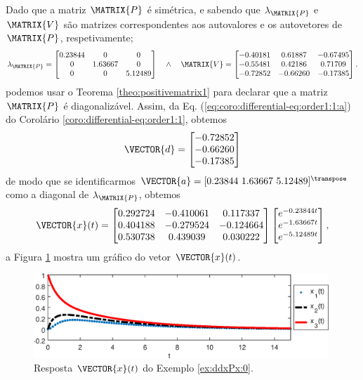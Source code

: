 \begin{SolutionT}
\label{ex:dxPx:0:sol1}
Dado que a matriz $\MATRIX{P}$ é simétrica, e
sabendo que $\lambda_{\MATRIX{P}}$ e $\MATRIX{V}$ são matrizes correspondentes aos autovalores e os autovetores de $\MATRIX{P}$,
respetivamente; 
\begin{equation}
\lambda_{\MATRIX{P}}=
\begin{bmatrix}
   0.23844 &       0 &       0\\
         0 & 1.63667 &       0\\
         0 &       0 & 5.12489
\end{bmatrix}
\quad \wedge \quad
\MATRIX{V}=
\begin{bmatrix}
  -0.40181 & 0.61887 &-0.67495\\
  -0.55481 & 0.42186 & 0.71709\\
  -0.72852 &-0.66260 &-0.17385
\end{bmatrix}.
\end{equation}
podemos usar o Teorema \ref{theo:positivematrix1} para declarar que a matriz $\MATRIX{P}$ é diagonalizável. 
Assim, da Eq. (\ref{eq:coro:differential-eq:order1:1:a}) do Corolário \ref{coro:differential-eq:order1:1},
obtemos
\begin{equation}
\VECTOR{d}=
\begin{bmatrix}
  -0.72852\\
  -0.66260\\
  -0.17385
\end{bmatrix}
\end{equation}
de modo que se identificarmos $\VECTOR{a}=[0.23844~ 1.63667~ 5.12489]^{\transpose}$ 
como a diagonal de $\lambda_{\MATRIX{P}}$,
obtemos
\begin{equation}
 \VECTOR{x}(t)= 
\begin{bmatrix}
   0.292724 &-0.410061 & 0.117337\\
   0.404188 &-0.279524 &-0.124664\\
   0.530738 & 0.439039 & 0.030222
\end{bmatrix}
\begin{bmatrix}
   e^{-0.23844 t}\\
   e^{-1.63667 t}\\
   e^{-5.12489 t}
\end{bmatrix},
\end{equation}
a Figura \ref{fig:ex:dxPx:0} mostra um gráfico do vetor $\VECTOR{x}(t)$.
\end{SolutionT}
     \begin{figure}[!h]
         \centering
         \includegraphics[width=0.99\textwidth]{chapters/differential-eq/mfiles/primeiroorder/primeirooder1.eps}
         \caption{Resposta $\VECTOR{x}(t)$ do Exemplo \ref{ex:ddxPx:0}.}
         \label{fig:ex:dxPx:0}
     \end{figure}
